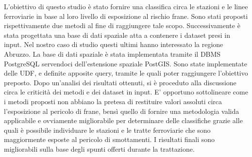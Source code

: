 L’obiettivo di questo studio è stato fornire una classifica circa le stazioni e le linee ferroviarie in base al loro livello di esposizione al rischio frane. Sono stati proposti rispettivamente due metodi al fine di raggiungere tale scopo.  Successivamente è stata progettata una base di dati spaziale atta a contenere i dataset presi in input. Nel nostro caso di studio questi ultimi hanno interessato la regione Abruzzo. La base di dati spaziale è stata implementata tramite il DBMS PostgreSQL servendoci dell’estensione spaziale PostGIS. Sono state implementate delle UDF, e definite apposite query, tramite le quali poter raggiungere l’obiettivo preposto. Dopo un’analisi dei risultati ottenuti, si è proceduto alla discussione circa le criticità dei metodi e dei dataset in input. E' opportuno sottolineare come i metodi proposti non abbiano la pretesa di restituire valori assoluti circa l’esposizione al pericolo di frane, bensì quello di fornire una metodologia valida applicabile e ovviamente migliorabile per determinare delle classifiche grazie alle quali è possibile individuare le stazioni e le tratte ferroviarie che sono maggiormente esposte al pericolo di smottamenti. I risultati finali sono migliorabili sulla base degli spunti offerti durante la trattazione.  